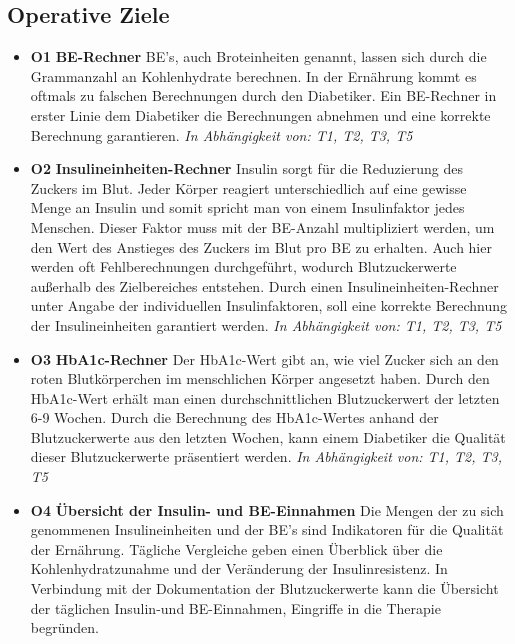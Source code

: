\documentclass[a4paper,11pt]{article}%
\renewcommand{\\}{\vspace*{0.5\baselineskip} \newline}
\begin{document}
\subsection{Operative Ziele}
\begin{itemize}
	\item \lbrack \textbf{O1}\rbrack  \textbf{ BE-Rechner} \\
	BE’s, auch Broteinheiten genannt, lassen sich durch die Grammanzahl an Kohlenhydrate berechnen. In der Ernährung kommt es oftmals zu falschen Berechnungen durch den Diabetiker. Ein BE-Rechner in erster Linie dem Diabetiker die Berechnungen abnehmen und eine korrekte Berechnung garantieren.\newline
	\emph{In Abhängigkeit von: T1, T2, T3, T5} 
	\item \lbrack \textbf{O2}\rbrack  \textbf{ Insulineinheiten-Rechner} \\
	Insulin sorgt für die Reduzierung des Zuckers im Blut. Jeder Körper reagiert unterschiedlich auf eine gewisse Menge an Insulin und somit spricht man von einem Insulinfaktor jedes Menschen. Dieser Faktor muss mit der BE-Anzahl multipliziert werden, um den Wert des Anstieges des Zuckers im Blut pro BE zu erhalten. Auch hier werden oft Fehlberechnungen durchgeführt, wodurch Blutzuckerwerte außerhalb des Zielbereiches entstehen. Durch einen Insulineinheiten-Rechner unter Angabe der individuellen Insulinfaktoren, soll eine korrekte Berechnung der Insulineinheiten garantiert werden.\newline
	\emph{In Abhängigkeit von: T1, T2, T3, T5} 
	\item \lbrack \textbf{O3}\rbrack  \textbf{ HbA1c-Rechner} \\
	Der HbA1c-Wert gibt an, wie viel Zucker sich an den roten Blutkörperchen im menschlichen Körper angesetzt haben. Durch den HbA1c-Wert erhält man einen durchschnittlichen Blutzuckerwert der letzten 6-9 Wochen. Durch die Berechnung des HbA1c-Wertes anhand der Blutzuckerwerte aus den letzten Wochen, kann einem Diabetiker die Qualität dieser Blutzuckerwerte präsentiert werden.\newline
	\emph{In Abhängigkeit von: T1, T2, T3, T5} 
	\item \lbrack \textbf{O4}\rbrack  \textbf{ Übersicht der Insulin- und BE-Einnahmen} \\
	Die Mengen der zu sich genommenen Insulineinheiten und der BE’s sind Indikatoren für die Qualität der Ernährung. Tägliche Vergleiche geben einen Überblick über die Kohlenhydratzunahme und der Veränderung der Insulinresistenz. In Verbindung mit der Dokumentation der Blutzuckerwerte kann die Übersicht der täglichen Insulin-und BE-Einnahmen, Eingriffe in die Therapie begründen.\newline

\end{itemize}
\end{document}

